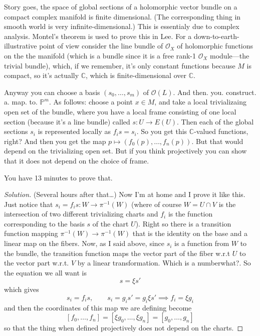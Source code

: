 Story goes, the space of global sections of a holomorphic vector bundle on a compact complex manifold is finite dimensional. (The corresponding thing in smooth world is very infinite-dimensional.) This is essentialy due to complex analysis. Montel's theorem is used to prove this in Lee. For a down-to-earth-illustrative point of view consider the line bundle of \(\mathcal{O}_X\) of holomorphic functions on the the manifold (which is a bundle since it is a free rank-1 \(\mathcal{O}_X\) module---the trivial bundle), which, if we remember, it's only constant functions because \(M\) is compact, so it's actually \(\mathbb{C}\), which is finite-dimensional over \(\mathbb{C}\).

Anyway you can choose a basis \((s_0,\ldots,s_m)\) of \(\mathcal{O}(L)\). And then. you. construct. a. map. to. \(\mathbb{P}^m\). As follows: choose a point \(x \in M\), and take a local trivializaing open set of the bundle, where you have a local frame consisting of one local section (because it's a line bundle) called \(s: U \to E(U)\). Then each of the global sections \(s_i\) is represented locally as \(f_is=s_i\). So you get this \(\mathbb{C}\)-valued functions, right? And then you get the map \(p \mapsto (f_0(p),\ldots,f_n(p))\). But that would depend on the trivializing open set. But if you think projectively you can show that it does not depend on the choice of frame.

\begin{exercise}\leavevmode
You have 13 minutes to prove that.
\end{exercise}
\begin{proof}[Solution]\leavevmode
 (Several hours after that…) Now I'm at home and I prove it like this. Just notice that \(s_i=f_is:W \to \pi^{-1}(W)\) (where of course \(W=U \cap V\) is the intersection of two different trivializing charts and \(f_i\) is the function corresponding to the basis \(s\) of the chart \(U\)). Right so there is a transition function mapping \(\pi^{-1}(W) \to \pi^{-1}(W)\) that is the identity on the base and a linear map on the fibers. Now, as I said above, since \(s_i\) is a function from \(W\) to the bundle, the transition function maps the vector part of the fiber w.r.t \(U\) to the vector part w.r.t. \(V\) by a linear transformation. Which is a number{\color{2}what?}. So the equation we all want is
\[s=\xi s'\]
which gives
\[s_i=f_is,\qquad s_i=g_is'=g_i\xi s' \implies f_i=\xi g_i\]
and then the coordinates of this map we are defining become
\[[f_0,\ldots,f_n]=[\xi g_0,\ldots,\xi g_n]=[g_0,\ldots,g_n]\]
so that the thing when defined projectively does not depend on the charts.
\end{proof}

